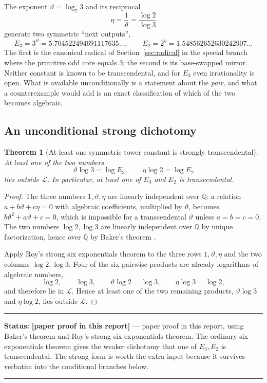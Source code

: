 \documentclass[11pt,oneside]{article}
\newtheorem{theorem}{Theorem}[section]
\theoremstyle{definition}
\theoremstyle{remark}
\newcommand{\Q}{\mathbb Q}
\newcommand{\Abar}{\overline{\mathbb Q}}
\newcommand{\thetaq}{\vartheta}
\newcommand{\LL}{\mathcal L}
\newcommand{\statusnew}{\textcolor{newgreen}{\textbf{[paper proof in this report]}}}
\newenvironment{statusbox}[1]
{\begin{center}\begin{minipage}{0.94\textwidth}\raggedright\hbadness=10000\hrule
\vspace{0.45em}\textbf{Status:} #1\par\vspace{0.35em}}
{\vspace{0.35em}\hrule\end{minipage}\end{center}}
\begin{document}
The exponent $\thetaq=\log_2 3$ and its reciprocal
\[
 \eta=\frac1{\thetaq}=\frac{\log2}{\log3}
\]
generate two symmetric ``next outputs'',
\[
 E_3=3^{\thetaq}=5.704522494691117635\ldots,
 \qquad
 E_2=2^{\eta}=1.548562652630242907\ldots
\]
The first is the canonical radical of Section~\ref{sec:radical} in the special branch where
the primitive odd core equals $3$; the second is its base-swapped mirror.  Neither constant
is known to be transcendental, and for $E_3$ even irrationality is open.  What is available
unconditionally is a statement about the \emph{pair}, and what a counterexample would add is
an exact classification of which of the two becomes algebraic.

\subsection{An unconditional strong dichotomy}

\begin{theorem}[At least one symmetric tower constant is strongly transcendental]
\label{tw:symmetric-unconditional}
At least one of the two numbers
\[
 \thetaq\log3=\log E_3,
 \qquad
 \eta\log2=\log E_2
\]
lies outside $\LL$.  In particular, at least one of $E_3$ and $E_2$ is transcendental.
\end{theorem}

\begin{proof}
The three numbers $1,\thetaq,\eta$ are linearly independent over $\Abar$: a relation
$a+b\thetaq+c\eta=0$ with algebraic coefficients, multiplied by $\thetaq$, becomes
$b\thetaq^2+a\thetaq+c=0$, which is impossible for a transcendental $\thetaq$ unless
$a=b=c=0$.  The two numbers $\log2,\log3$ are linearly independent over $\Q$ by unique
factorization, hence over $\Abar$ by Baker's theorem \cite{Baker1975}.

Apply Roy's strong six exponentials theorem \cite{Roy1992,Waldschmidt2005} to the three rows
$1,\thetaq,\eta$ and the two columns $\log2,\log3$.  Four of the six pairwise products are
already logarithms of algebraic numbers,
\[
 \log2,\qquad\log3,\qquad\thetaq\log2=\log3,\qquad\eta\log3=\log2,
\]
and therefore lie in $\LL$.  Hence at least one of the two remaining products,
$\thetaq\log3$ and $\eta\log2$, lies outside $\LL$.
\end{proof}

\begin{statusbox}{\statusnew{} --- paper proof in this report, using Baker's theorem and
Roy's strong six exponentials theorem.  The ordinary six exponentials theorem gives the
weaker dichotomy that one of $E_3,E_2$ is transcendental.  The strong form is worth the extra
input because it survives verbatim into the conditional branches below.}
\end{statusbox}
\end{document}

